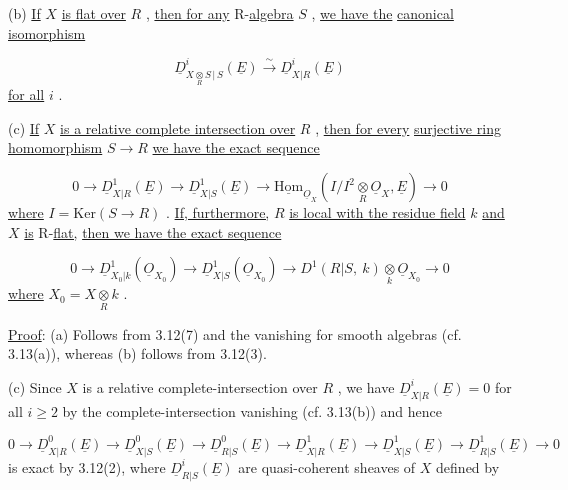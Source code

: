 (b)  \underline{If}  $X$  \underline{is flat over}  $R$ , \underline{then for any} R-\underline{algebra}  $S$ , \underline{we have the} \underline{canonical isomorphism}

\begin{equation*}
\underline{D}^i_{X\underset{R}{\otimes}S\,|\,S}(\underline{E}) \overset{\sim}{\to} \underline{D}^i_{X|R}(\underline{E})
\end{equation*}
\underline{for all}  $i$ .

(c)  \underline{If}  $X$  \underline{is a relative complete intersection over}  $R$ , \underline{then for every} \underline{surjective ring homomorphism}  $S \to R$  \underline{we have the exact sequence}

\begin{equation*}
0 \to \underline{D}^1_{X|R}(\underline{E}) \to \underline{D}^1_{X|S}(\underline{E}) \to \underline{\mathrm{Hom}}_{\underline{O}_X}(I/I^2\underset{R}{\otimes}\underline{O}_X, \underline{E}) \to 0
\end{equation*}
\underline{where}  $I = \mathrm{Ker}(S \to R)$ . \underline{If, furthermore,}  $R$  \underline{is local with the residue field}  $k$ \underline{and}  $X$  \underline{is} R-\underline{flat,} \underline{then we have the exact sequence}

\begin{equation*}
0 \to \underline{D}^1_{X_0|k}(\underline{O}_{X_0}) \to \underline{D}^1_{X|S}(\underline{O}_{X_0}) \to D^1(R|S,\ k)\underset{k}{\otimes}\underline{O}_{X_0} \to 0
\end{equation*}
\underline{where}  $X_0 = X\underset{R}{\otimes}k$ .

\underline{Proof}:  (a)  Follows from 3.12(7) and the vanishing for smooth algebras (cf. 3.13(a)), whereas (b) follows from 3.12(3).

(c)  Since  $X$  is a relative complete-intersection over  $R$ , we have $\underline{D}^i_{X|R}(\underline{E}) = 0$  for all  $i \geq 2$  by the complete-intersection vanishing (cf. 3.13(b)) and hence

\begin{equation*}
0 \to \underline{D}^0_{X|R}(\underline{E}) \to \underline{D}^0_{X|S}(\underline{E}) \to \underline{D}^0_{R|S}(\underline{E}) \to \underline{D}^1_{X|R}(\underline{E}) \to \underline{D}^1_{X|S}(\underline{E}) \to \underline{D}^1_{R|S}(\underline{E}) \to 0
\end{equation*}
is exact by 3.12(2), where  $\underline{D}^i_{R|S}(\underline{E})$  are quasi-coherent sheaves of  $X$  defined by

